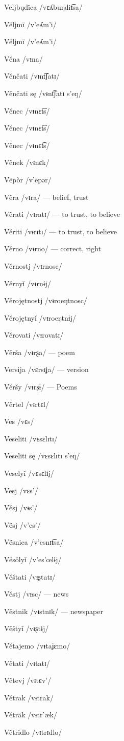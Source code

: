 Veljbųdïca /vɛʎbuŋdit͡sa/

Vëljmï /v’eʎm’i/

Vëljmï /v’eʎm’i/

Věna /vᵻna/

Věnčati /vᵻnt͡ʃatɪ/

Věnčati sę /vᵻnt͡ʃatɪ s’eŋ/

Věnec /vᵻnɛt͡s/

Věnec /vᵻnɛt͡s/

Věnec /vᵻnɛt͡s/

Věnek /vᵻnɛk/

Vëpòr /v’epər/

Věra /vᵻra/ — belief, trust

Věrati /vᵻratɪ/ — to trust, to believe

Věriti /vᵻrɪtɪ/ — to trust, to believe

Věrno /vᵻrno/ — correct, right

Věrnostj /vᵻrnosc/

Věrnyǐ /vᵻrnɨj/

Věrojętnostj /vᵻroeŋtnosc/

Věrojętnyǐ /vᵻroeŋtnɨj/

Věrovati /vᵻrovatɪ/

Věrša /vᵻrʂa/ — poem

Versija /vɛrsɪʝa/ — version

Věršy /vᵻrʂɨ/ — Poems

Věrtel /vᵻrtɛl/

Ves /vɛs/

Veseliti /vɛsɛlɪtɪ/

Veseliti sę /vɛsɛlɪtɪ s’eŋ/

Veselyǐ /vɛsɛlɨj/

Vesj /vɛs’/

Věsj /vᵻs’/

Vësj /v’es’/

Vësnica /v’esnɪt͡sa/

Vësölyǐ /v’es’œlɨj/

Věštati /vᵻʂtatɪ/

Věstj /vᵻsc/ — news

Věstnik /vᵻstnɪk/ — newspaper

Věštyǐ /vᵻʂtɨj/

Větajemo /vᵻtaʝɛmo/

Větati /vᵻtatɪ/

Větevj /vᵻtɛv’/

Větrak /vᵻtrak/

Věträk /vᵻtr’æk/

Větridlo /vᵻtrɪdlo/

